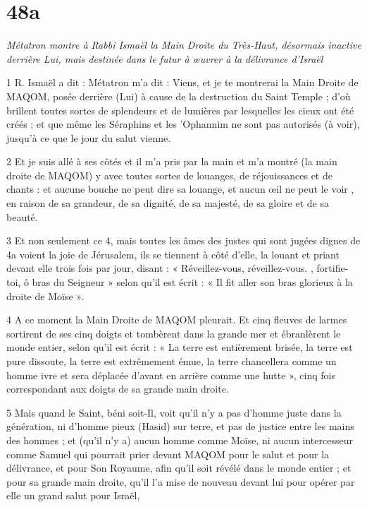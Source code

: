 \chapter{48a}

\par \textit{Métatron montre à Rabbi Ismaël la Main Droite du Très-Haut, désormais inactive derrière Lui, mais destinée dans le futur à œuvrer à la délivrance d'Israël}

\par 1 R. Ismaël a dit : Métatron m'a dit : Viens, et je te montrerai la Main Droite de MAQOM, posée derrière (Lui) à cause de la destruction du Saint Temple ; d'où brillent toutes sortes de splendeurs et de lumières par lesquelles les cieux ont été créés ; et que même les Séraphins et les 'Ophannim ne sont pas autorisés (à voir), jusqu'à ce que le jour du salut vienne.

\par 2 Et je suis allé à ses côtés et il m'a pris par la main et m'a montré (la main droite de MAQOM) y avec toutes sortes de louanges, de réjouissances et de chants : et aucune bouche ne peut dire sa louange, et aucun œil ne peut le voir , en raison de sa grandeur, de sa dignité, de sa majesté, de sa gloire et de sa beauté.

\par 3 Et non seulement ce 4, mais toutes les âmes des justes qui sont jugées dignes de 4a voient la joie de Jérusalem, ils se tiennent à côté d'elle, la louant et priant devant elle trois fois par jour, disant : « Réveillez-vous, réveillez-vous. , fortifie-toi, ô bras du Seigneur » selon qu'il est écrit : « Il fit aller son bras glorieux à la droite de Moïse ».

\par 4 A ce moment la Main Droite de MAQOM pleurait. Et cinq fleuves de larmes sortirent de ses cinq doigts et tombèrent dans la grande mer et ébranlèrent le monde entier, selon qu'il est écrit : « La terre est entièrement brisée, la terre est pure dissoute, la terre est extrêmement émue, la terre chancellera comme un homme ivre et sera déplacée d'avant en arrière comme une hutte », cinq fois correspondant aux doigts de sa grande main droite.

\par 5 Mais quand le Saint, béni soit-Il, voit qu'il n'y a pas d'homme juste dans la génération, ni d'homme pieux (Hasid) sur terre, et pas de justice entre les mains des hommes ; et (qu'il n'y a) aucun homme comme Moïse, ni aucun intercesseur comme Samuel qui pourrait prier devant MAQOM pour le salut et pour la délivrance, et pour Son Royaume, afin qu'il soit révélé dans le monde entier ; et pour sa grande main droite, qu'il l'a mise de nouveau devant lui pour opérer par elle un grand salut pour Israël,

